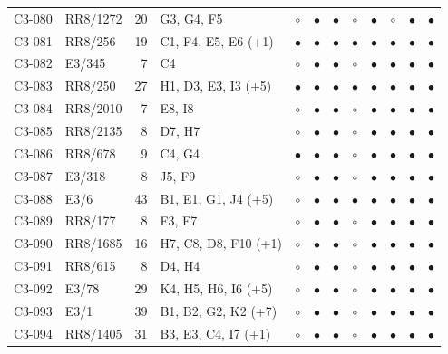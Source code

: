 {\begin{longtable}{llrp{3.9cm}cccccccc}
    C3-080 & RR8/1272 & 20 & G3, G4, F5 & $\circ$ & $\bullet$ & $\bullet$ & $\circ$ & $\bullet$ & $\circ$ & $\bullet$ & $\bullet$ \\
    C3-081 & RR8/256 & 19 & C1, F4, E5, E6 (+1) & $\bullet$ & $\bullet$ & $\bullet$ & $\bullet$ & $\bullet$ & $\bullet$ & $\bullet$ & $\bullet$ \\
    C3-082 & E3/345 & 7 & C4 & $\circ$ & $\bullet$ & $\bullet$ & $\circ$ & $\bullet$ & $\bullet$ & $\bullet$ & $\bullet$ \\
    C3-083 & RR8/250 & 27 & H1, D3, E3, I3 (+5) & $\bullet$ & $\bullet$ & $\bullet$ & $\bullet$ & $\bullet$ & $\bullet$ & $\bullet$ & $\bullet$ \\
    C3-084 & RR8/2010 & 7 & E8, I8 & $\circ$ & $\bullet$ & $\bullet$ & $\circ$ & $\bullet$ & $\bullet$ & $\bullet$ & $\bullet$ \\
    C3-085 & RR8/2135 & 8 & D7, H7 & $\circ$ & $\bullet$ & $\bullet$ & $\circ$ & $\bullet$ & $\bullet$ & $\bullet$ & $\bullet$ \\
    C3-086 & RR8/678 & 9 & C4, G4 & $\bullet$ & $\bullet$ & $\bullet$ & $\circ$ & $\bullet$ & $\bullet$ & $\bullet$ & $\bullet$ \\
    C3-087 & E3/318 & 8 & J5, F9 & $\circ$ & $\bullet$ & $\bullet$ & $\circ$ & $\bullet$ & $\bullet$ & $\bullet$ & $\bullet$ \\
    C3-088 & E3/6 & 43 & B1, E1, G1, J4 (+5) & $\circ$ & $\bullet$ & $\bullet$ & $\bullet$ & $\bullet$ & $\bullet$ & $\bullet$ & $\bullet$ \\
    C3-089 & RR8/177 & 8 & F3, F7 & $\circ$ & $\bullet$ & $\bullet$ & $\circ$ & $\bullet$ & $\bullet$ & $\bullet$ & $\bullet$ \\
    C3-090 & RR8/1685 & 16 & H7, C8, D8, F10 (+1) & $\circ$ & $\bullet$ & $\bullet$ & $\circ$ & $\bullet$ & $\bullet$ & $\bullet$ & $\bullet$ \\
    C3-091 & RR8/615 & 8 & D4, H4 & $\circ$ & $\bullet$ & $\bullet$ & $\circ$ & $\bullet$ & $\bullet$ & $\bullet$ & $\bullet$ \\
    C3-092 & E3/78 & 29 & K4, H5, H6, I6 (+5) & $\circ$ & $\bullet$ & $\bullet$ & $\circ$ & $\bullet$ & $\bullet$ & $\bullet$ & $\bullet$ \\
    C3-093 & E3/1 & 39 & B1, B2, G2, K2 (+7) & $\circ$ & $\bullet$ & $\bullet$ & $\circ$ & $\bullet$ & $\bullet$ & $\bullet$ & $\bullet$ \\
    C3-094 & RR8/1405 & 31 & B3, E3, C4, I7 (+1) & $\circ$ & $\bullet$ & $\bullet$ & $\circ$ & $\bullet$ & $\bullet$ & $\bullet$ & $\bullet$ \\

\end{longtable}}
